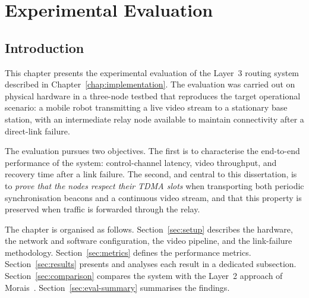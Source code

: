 
\chapter{Experimental Evaluation}
\label{chap:evaluation}

\section{Introduction}
\label{sec:eval-intro}

This chapter presents the experimental evaluation of the Layer~3 routing
system described in Chapter~\ref{chap:implementation}. The evaluation was
carried out on physical hardware in a three-node testbed that reproduces the
target operational scenario: a mobile robot transmitting a live video stream
to a stationary base station, with an intermediate relay node available to
maintain connectivity after a direct-link failure.

The evaluation pursues two objectives. The first is to characterise the
end-to-end performance of the system: control-channel latency, video
throughput, and recovery time after a link failure. The second, and central
to this dissertation, is to \emph{prove that the nodes respect their TDMA
slots} when transporting both periodic synchronisation beacons and a
continuous video stream, and that this property is preserved when traffic is
forwarded through the relay.

The chapter is organised as follows. Section~\ref{sec:setup} describes the
hardware, the network and software configuration, the video pipeline, and the
link-failure methodology. Section~\ref{sec:metrics} defines the performance
metrics. Section~\ref{sec:results} presents and analyses each result in a
dedicated subsection. Section~\ref{sec:comparison} compares the system with
the Layer~2 approach of Morais~\cite{morais2024synchronization}.
Section~\ref{sec:eval-summary} summarises the findings.


